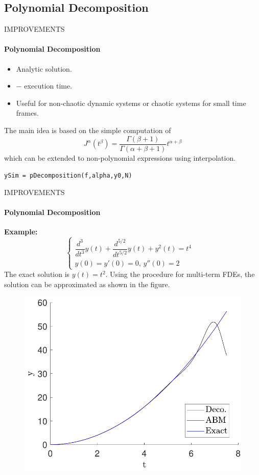 \subsection{Polynomial Decomposition}
\begin{frame}{IMPROVEMENTS}
\framesubtitle{Polynomial Decomposition}
\begin{itemize}
    \item Analytic solution.
    \item $-$ execution time.
    \item Useful for non-chaotic dynamic systems or chaotic systems for small time frames.
\end{itemize}
The main idea is based on the simple computation of
\begin{equation}
    J^\alpha\left(t^\beta\right)=\dfrac{\Gamma(\beta+1)}{\Gamma(\alpha+\beta+1)}t^{\alpha+\beta}
\end{equation}
which can be extended to non-polynomial expressions using interpolation.

\begin{center}
    \texttt{ySim = pDecomposition(f,alpha,y0,N)}
\end{center}
\end{frame}

\begin{frame}{IMPROVEMENTS}
\framesubtitle{Polynomial Decomposition}
    \textbf{Example:}\\[0.4cm]
    \begin{equation}
        \begin{cases}
        \dfrac{d^3}{dt^3}y(t)+\dfrac{d^{5/2}}{dt^{5/2}}y(t)+y^2(t)=t^4&\\
        y(0)=y'(0)=0,\,y''(0)=2
        \end{cases}
    \end{equation}
    The exact solution is $y(t)=t^2$. Using the procedure for multi-term FDEs, the solution can be approximated as shown in the figure.
    \begin{figure}[H]
        \centering
        \includegraphics[scale=0.35]{files/mejoras/ABM-vs-Deco-Exact.pdf}
    \end{figure}
\end{frame}

